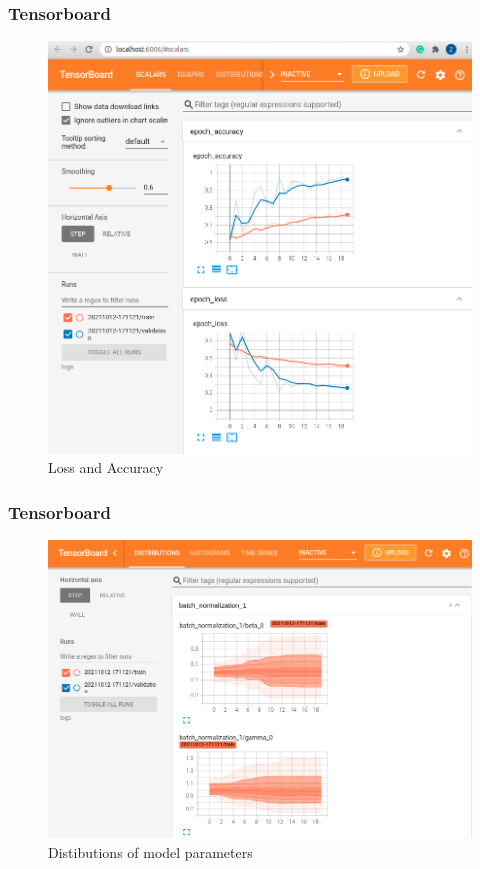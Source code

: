 \documentclass{beamer}
\begin{document}
\begin{frame}
	\frametitle{Tensorboard}
	\begin{center}
		\begin{figure}
        \includegraphics[width=0.6\linewidth]{./src/figures/10_1.png}
        \caption{Loss and Accuracy}
		\end{figure}
	\end{center}
\end{frame}

\begin{frame}
	\frametitle{Tensorboard}
	\begin{center}
		\begin{figure}
        \includegraphics[width=0.8\linewidth]{./src/figures/10_3.png}
        \caption{Distibutions of model parameters}
		\end{figure}
	\end{center}
\end{frame}
\end{document}
